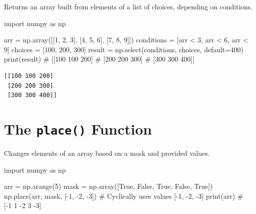 \documentclass[
  english,
  letterpaper,
  DIV=11,
  numbers=noendperiod]{scrreprt}
\newenvironment{Shaded}{\begin{snugshade}}{\end{snugshade}}
\newcommand{\BuiltInTok}[1]{\textcolor[rgb]{0.00,0.23,0.31}{#1}}
\newcommand{\CommentTok}[1]{\textcolor[rgb]{0.37,0.37,0.37}{#1}}
\newcommand{\DecValTok}[1]{\textcolor[rgb]{0.68,0.00,0.00}{#1}}
\newcommand{\ImportTok}[1]{\textcolor[rgb]{0.00,0.46,0.62}{#1}}
\newcommand{\NormalTok}[1]{\textcolor[rgb]{0.00,0.23,0.31}{#1}}
\newcommand{\OperatorTok}[1]{\textcolor[rgb]{0.37,0.37,0.37}{#1}}
\newcommand{\VariableTok}[1]{\textcolor[rgb]{0.07,0.07,0.07}{#1}}
\begin{document}
Returns an array built from elements of a list of choices, depending on
conditions.

\begin{Shaded}
\begin{Highlighting}[]
\ImportTok{import}\NormalTok{ numpy }\ImportTok{as}\NormalTok{ np}

\NormalTok{arr }\OperatorTok{=}\NormalTok{ np.array([[}\DecValTok{1}\NormalTok{, }\DecValTok{2}\NormalTok{, }\DecValTok{3}\NormalTok{], [}\DecValTok{4}\NormalTok{, }\DecValTok{5}\NormalTok{, }\DecValTok{6}\NormalTok{], [}\DecValTok{7}\NormalTok{, }\DecValTok{8}\NormalTok{, }\DecValTok{9}\NormalTok{]])}
\NormalTok{conditions }\OperatorTok{=}\NormalTok{ [arr }\OperatorTok{\textless{}} \DecValTok{3}\NormalTok{, arr }\OperatorTok{\textless{}} \DecValTok{6}\NormalTok{, arr }\OperatorTok{\textless{}} \DecValTok{9}\NormalTok{]}
\NormalTok{choices }\OperatorTok{=}\NormalTok{ [}\DecValTok{100}\NormalTok{, }\DecValTok{200}\NormalTok{, }\DecValTok{300}\NormalTok{]}
\NormalTok{result }\OperatorTok{=}\NormalTok{ np.select(conditions, choices, default}\OperatorTok{=}\DecValTok{400}\NormalTok{)}
\BuiltInTok{print}\NormalTok{(result)}
\CommentTok{\# [[100 100 200]}
\CommentTok{\#  [200 200 300]}
\CommentTok{\#  [300 300 400]]}
\end{Highlighting}
\end{Shaded}

\begin{verbatim}
[[100 100 200]
 [200 200 300]
 [300 300 400]]
\end{verbatim}

\section{\texorpdfstring{The \texttt{place()}
Function}{The place() Function}}\label{the-place-function}

Changes elements of an array based on a mask and provided values.

\begin{Shaded}
\begin{Highlighting}[]
\ImportTok{import}\NormalTok{ numpy }\ImportTok{as}\NormalTok{ np}

\NormalTok{arr }\OperatorTok{=}\NormalTok{ np.arange(}\DecValTok{5}\NormalTok{)}
\NormalTok{mask }\OperatorTok{=}\NormalTok{ np.array([}\VariableTok{True}\NormalTok{, }\VariableTok{False}\NormalTok{, }\VariableTok{True}\NormalTok{, }\VariableTok{False}\NormalTok{, }\VariableTok{True}\NormalTok{])}
\NormalTok{np.place(arr, mask, [}\OperatorTok{{-}}\DecValTok{1}\NormalTok{, }\OperatorTok{{-}}\DecValTok{2}\NormalTok{, }\OperatorTok{{-}}\DecValTok{3}\NormalTok{])  }\CommentTok{\# Cyclically uses values [{-}1, {-}2, {-}3]}
\BuiltInTok{print}\NormalTok{(arr)  }\CommentTok{\# [{-}1  1 {-}2  3 {-}3]}
\end{Highlighting}
\end{Shaded}
\end{document}
